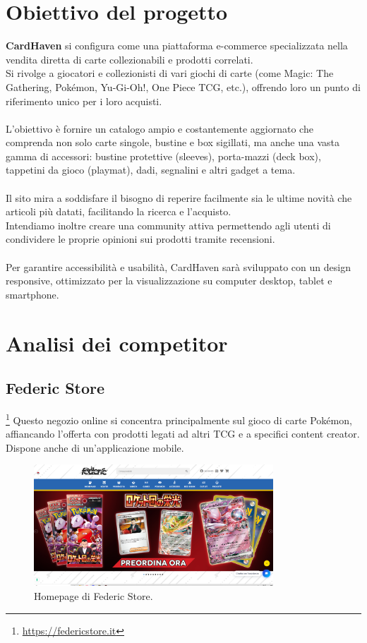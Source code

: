 \documentclass[14pt]{extreport}
\begin{document}
\chapter{Obiettivo del progetto}
\textbf{CardHaven} si configura come una piattaforma e-commerce specializzata nella vendita diretta di 
carte collezionabili e prodotti correlati. \\ Si rivolge a giocatori e collezionisti di 
vari giochi di carte (come Magic: The Gathering, Pokémon, Yu-Gi-Oh!, One Piece TCG, etc.), 
offrendo loro un punto di riferimento unico per i loro acquisti.\\\\
\noindent
L'obiettivo è fornire un catalogo ampio e costantemente aggiornato che comprenda non solo carte singole,
 bustine e box sigillati, ma anche una vasta gamma di accessori: bustine protettive 
 (sleeves), porta-mazzi (deck box), tappetini da gioco (playmat), dadi, segnalini e altri gadget a tema.\\\\
\noindent
Il sito mira a soddisfare il bisogno di reperire facilmente sia le ultime novità che articoli più datati, 
facilitando la ricerca e l'acquisto. \\ Intendiamo inoltre creare una community attiva permettendo agli 
utenti di condividere le proprie opinioni sui prodotti tramite recensioni.\\\\
\noindent
Per garantire accessibilità e usabilità, CardHaven sarà sviluppato con un design responsive, 
ottimizzato per la visualizzazione su computer desktop, tablet e smartphone.


\chapter{Analisi dei competitor}
\section{Federic Store}\footnote{\url{https://federicstore.it}}
Questo negozio online si concentra principalmente sul gioco di carte Pokémon, affiancando l'offerta con prodotti legati ad altri TCG e a specifici content creator. Dispone anche di un'applicazione mobile.

\begin{figure}[h!] 
    \centering
    \includegraphics[width=0.8\textwidth]{federic-store.png}
    \caption{Homepage di Federic Store.}
\end{figure}
\end{document}
